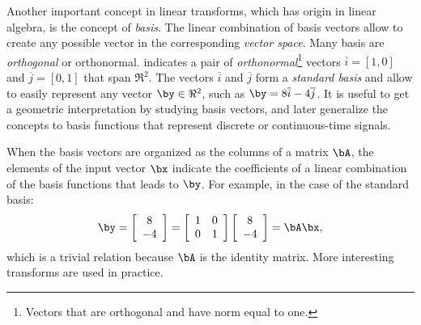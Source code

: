 Another important concept in linear transforms, which has origin in linear algebra, is the concept of \emph{basis}. The linear combination of basis vectors allow to create any possible vector in the corresponding \emph{vector space}. Many basis are \emph{orthogonal} or orthonormal.
 indicates a pair of \emph{orthonormal}\footnote{Vectors that are orthogonal and have norm equal to one.} vectors $\overline i=[1, 0]$ and $\overline j=[0, 1]$ that span $\Re^2$. The vectors $\overline i$ and $\overline j$ form a \emph{standard basis} and allow to easily represent any vector $\by \in \Re^2$, such as $\by=8 \overline i - 4 \overline j$.
It is useful to get a geometric interpretation by studying basis vectors, and later generalize the concepts to basis functions that represent discrete or continuous-time signals.

When the basis vectors are organized as the columns of a matrix $\bA$, the
elements of the input vector $\bx$ indicate the coefficients of a linear combination of the basis functions that leads to $\by$. For example, in the case of the standard basis:
\[
\by = \left[ \begin{array}{c}
8 \\
-4
 \\ \end{array} \right] =
\left[ \begin{array}{cc}
1 & 0\\
0 & 1
 \\ \end{array} \right] \left[ \begin{array}{c}
8 \\
-4
 \\ \end{array} \right] = \bA \bx,
\]
which is a trivial relation because $\bA$ is the identity matrix. More interesting transforms are used in practice. 


